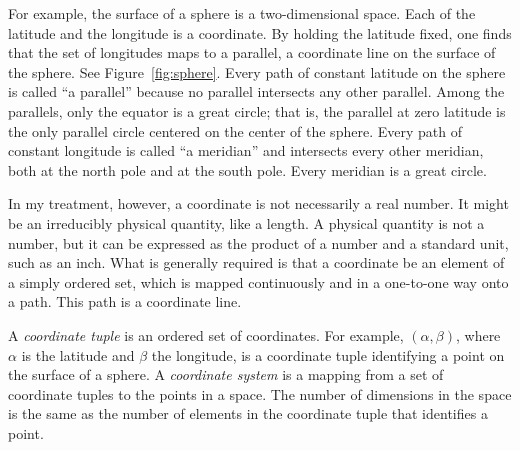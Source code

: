 For example, the surface of a sphere is a two-dimensional space.  Each of the
latitude and the longitude is a coordinate.  By holding the latitude fixed, one
finds that the set of longitudes maps to a parallel, a coordinate line on the
surface of the sphere.  See Figure~\ref{fig:sphere}.  Every path of constant
latitude on the sphere is called ``a parallel'' because no parallel intersects
any other parallel.  Among the parallels, only the equator is a great circle;
that is, the parallel at zero latitude is the only parallel circle centered on
the center of the sphere.  Every path of constant longitude is called ``a
meridian'' and intersects every other meridian, both at the north pole and at
the south pole.  Every meridian is a great circle.

In my treatment, however, a coordinate is not necessarily a real number.  It
might be an irreducibly physical quantity, like a length.  A physical quantity
is not a number, but it can be expressed as the product of a number and a
standard unit, such as an inch.  What is generally required is that a
coordinate be an element of a simply ordered set,
which is mapped continuously and in a one-to-one way onto a path.
This path is a coordinate line.

A \emph{coordinate tuple} is an ordered set of coordinates.  For example,
$(\alpha,\beta)$, where $\alpha$ is the latitude and $\beta$ the longitude, is
a coordinate tuple identifying a point on the surface of a sphere.  A
\emph{coordinate system} is a mapping from a set of coordinate tuples to the
points in a space.  The number of dimensions in the space is the same as
the number of elements in the coordinate tuple that identifies a point.

